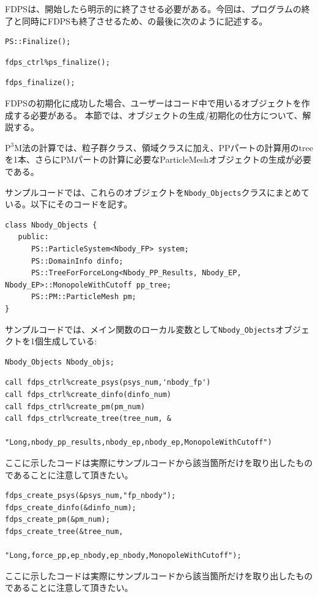 FDPSは、開始したら明示的に終了させる必要がある。今回は、プログラムの終了と同時にFDPSも終了させるため、\mainFunc の最後に次のように記述する。

\ifCpp %
\begin{lstlisting}[caption=FDPSの終了]
PS::Finalize();
\end{lstlisting}
\endifCpp
\ifFtn %
\begin{lstlisting}[caption=FDPSの終了]
fdps_ctrl%ps_finalize();
\end{lstlisting}
\endifFtn
\ifC %
\begin{lstlisting}[caption=FDPSの終了]
fdps_finalize();
\end{lstlisting}
\endifC

FDPSの初期化に成功した場合、ユーザーはコード中で用いるオブジェクトを作成する必要がある。
本節では、オブジェクトの生成/初期化の仕方について、解説する。

$\mathrm{P^{3}M}$法の計算では、粒子群クラス、領域クラスに加え、PPパートの計算用のtreeを1本、さらにPMパートの計算に必要なParticleMeshオブジェクトの生成が必要である。

\ifCpp %
サンプルコードでは、これらのオブジェクトを\texttt{Nbody\_Objects}クラスにまとめている。以下にそのコードを記す。
\begin{lstlisting}[caption=\texttt{Nbody\_Objects}クラス]
class Nbody_Objects {
   public:
      PS::ParticleSystem<Nbody_FP> system;
      PS::DomainInfo dinfo;
      PS::TreeForForceLong<Nbody_PP_Results, Nbody_EP, Nbody_EP>::MonopoleWithCutoff pp_tree;
      PS::PM::ParticleMesh pm;
}
\end{lstlisting}
サンプルコードでは、メイン関数のローカル変数として\texttt{Nbody\_Objects}オブジェクトを1個生成している:
\begin{lstlisting}[caption=\texttt{Nbody\_Objects}クラスのオブジェクト生成]
Nbody_Objects Nbody_objs;
\end{lstlisting}
\endifCpp

\ifFtn %
\begin{lstlisting}[caption=オブジェクトの生成]
call fdps_ctrl%create_psys(psys_num,'nbody_fp')
call fdps_ctrl%create_dinfo(dinfo_num)
call fdps_ctrl%create_pm(pm_num)
call fdps_ctrl%create_tree(tree_num, &                                                  
                           "Long,nbody_pp_results,nbody_ep,nbody_ep,MonopoleWithCutoff")
\end{lstlisting}
ここに示したコードは実際にサンプルコードから該当箇所だけを取り出したものであることに注意して頂きたい。
\endifFtn
\ifC %
\begin{lstlisting}[caption=オブジェクトの生成]
fdps_create_psys(&psys_num,"fp_nbody");
fdps_create_dinfo(&dinfo_num);
fdps_create_pm(&pm_num);
fdps_create_tree(&tree_num,
                 "Long,force_pp,ep_nbody,ep_nbody,MonopoleWithCutoff");
\end{lstlisting}
ここに示したコードは実際にサンプルコードから該当箇所だけを取り出したものであることに注意して頂きたい。
\endifC

